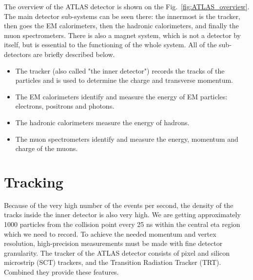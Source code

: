 The overview of the ATLAS detector is shown on the Fig.~\ref{fig:ATLAS_overview}. The main detector sub-systems can be seen there: the innermost is the tracker, then goes the EM calorimeters, then the hadronic calorimeters, and finally the muon spectrometers. There is also a magnet system, which is not a detector by itself, but is essential to the functioning of the whole system. All of the sub-detectors are briefly described below.

\begin{itemize}
\item The tracker (also called "the inner detector") records the tracks of the particles and is used to determine the charge and transverse momentum.
\item The EM calorimeters identify and measure the energy of EM particles: electrons, positrons and photons.
\item The hadronic calorimeters measure the energy of hadrons.
\item The muon spectrometers identify and measure the energy, momentum and charge of the muons.
\end{itemize}



\section{Tracking}
\label{sec:ATLAS_tracker}

Because of the very high number of the events per second, the density of the tracks inside the inner detector is also very high. We are getting approximately 1000 particles
from the collision point every 25 ns within the central eta region which we need to record. To achieve the needed momentum and vertex resolution, high-precision measurements must be made with fine detector granularity. The tracker of the ATLAS detector consists of pixel and silicon microstrip (SCT) trackers, and the Transition Radiation Tracker (TRT). Combined they provide these features.

\begin{figure}[htb]
\end{figure}

